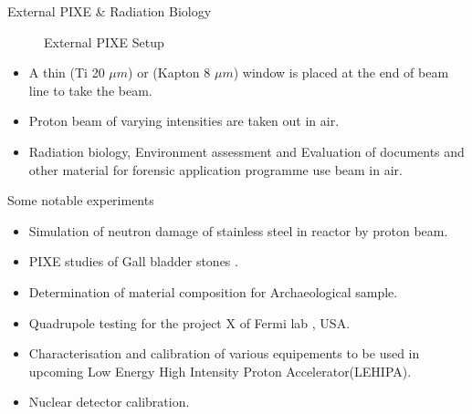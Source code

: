 \documentclass[11pt]{beamer}
\begin{document}
\begin{frame}{External PIXE \& Radiation Biology}
\begin{figure}
        \caption{External PIXE Setup}\label{fig:External PIXE Setup}
\end{figure}
  
  
  \begin{itemize}
     
    
    \item A thin (Ti 20 $\mu m$) or (Kapton 8 $\mu m$) window is placed at the end of beam line to take the beam. 
	\item Proton beam of varying intensities are taken out in air.
	\item Radiation biology, Environment assessment and Evaluation of documents and other material for forensic application  programme use beam in air.
	           
   \end{itemize}


\end{frame}


\begin{frame}{Some notable experiments}
  
  
  \begin{itemize}
     
    
    \item Simulation of neutron damage of stainless steel in reactor by proton beam. 
	\item PIXE studies of Gall bladder stones .
	\item Determination of material composition for Archaeological sample.
	\item Quadrupole testing for the project X of Fermi lab , USA.          
    \item Characterisation and calibration of various equipements to be used in upcoming Low Energy High Intensity Proton Accelerator(LEHIPA).
    \item Nuclear detector calibration.
   \end{itemize}


\end{frame}
\end{document}
